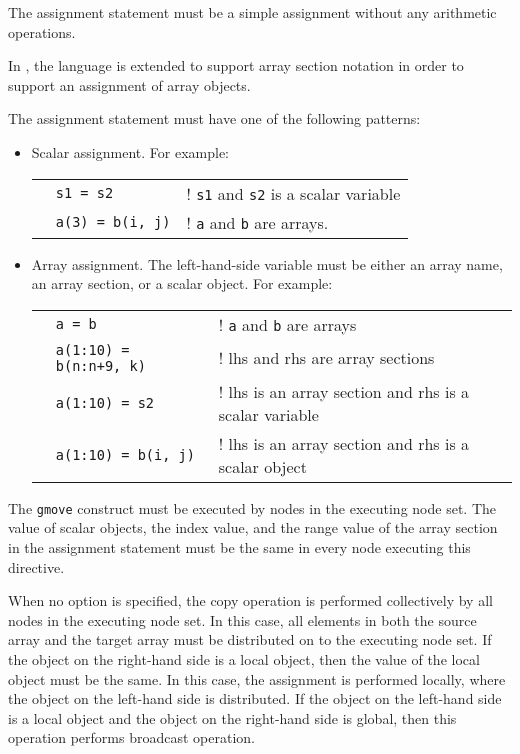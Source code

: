 The assignment statement must be a simple assignment without
any arithmetic operations.   

In {\XMP}, the {\C} language is extended to support array section
notation in order to support an assignment of array objects.

The assignment statement must have one of the following patterns:

\begin{itemize}
\item  Scalar assignment. For example:

\begin{tabular}{lll}
\hspace{0.5cm} & {\tt s1 = s2} & ! {\tt s1} and {\tt s2} is a scalar
variable \\ 
& {\tt a(3) = b(i, j)} & ! {\tt a} and {\tt b} are arrays. \\
\end{tabular}

\item Array assignment. The left-hand-side variable must be either an
      array name, an array section, or a scalar object. For example:

\begin{tabular}{lll}
\hspace{0.5cm} & {\tt a = b} & ! {\tt a} and {\tt b} are arrays \\
 & {\tt a(1:10) = b(n:n+9, k)} & ! lhs and rhs are array sections \\
 & {\tt a(1:10) = s2} & ! lhs is an array section and rhs is a
 scalar variable \\
 & {\tt a(1:10) = b(i, j)} & ! lhs is an array section and rhs is a
 scalar object \\
\end{tabular}
\end{itemize}

The {\tt gmove} construct must be executed by nodes in the executing
node set. The value of scalar objects, the index value, and the range
value of the array section in the assignment statement must be the same in
every node executing this directive.

When no option is specified, the copy operation is performed
collectively by all nodes in the executing node set. In this case, all
elements in both the source array and the target array must be distributed on
to the executing node set. If the object on the right-hand side is a local
object, then the value of the local object must be the same. In this case, the
assignment is performed locally, where the object on the left-hand side is 
distributed. If the object on the left-hand side is a local object
and the object on the right-hand side is global, then this operation
performs broadcast operation.

